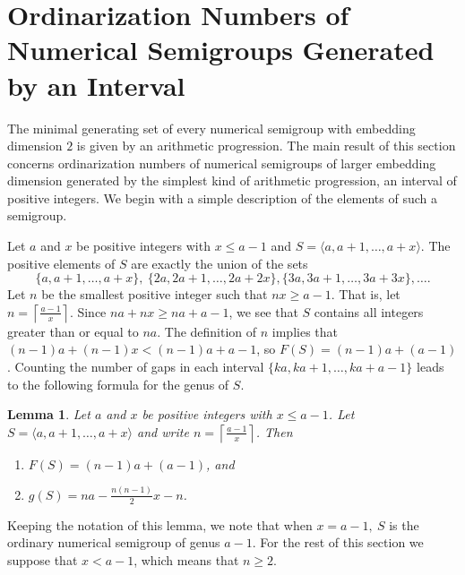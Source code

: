 \documentclass[12pt]{amsart}
\theoremstyle{plain}\newtheorem{proposition}{Proposition}[section]
\newtheorem{lemma}[proposition]{Lemma}
\begin{document}
\section{Ordinarization Numbers of Numerical Semigroups Generated by an Interval}\label{sec:interval}

The minimal generating set of every numerical semigroup with embedding dimension $2$ is given by an arithmetic progression.  The main result of this section concerns ordinarization numbers of numerical semigroups of larger embedding dimension generated by the simplest kind of arithmetic progression, an interval of positive integers.  We begin with a simple description of the elements of such a semigroup.

Let $a$ and $x$ be positive integers with $x \le a-1$ and $S = \langle a,a+1,\ldots, a+x\rangle$.  The positive elements of $S$ are exactly the union of the sets 
\[
\{a,a+1,\ldots, a+x\},\ \{2a,2a+1,\ldots, 2a+2x\},\{3a,3a+1,\ldots, 3a+3x\},\ldots.
\]
Let $n$ be the smallest positive integer such that $nx \ge a-1$.  That is, let $n = \left\lceil \frac{a-1}{x} \right\rceil$.  Since $na + nx \ge na+a-1$, we see that $S$ contains all integers greater than or equal to $na$.  The definition of $n$ implies that $(n-1)a + (n-1)x < (n-1)a+a-1$, so $F(S) = (n-1)a + (a-1)$.  Counting the number of gaps in each interval $\{ka, ka+1,\ldots, ka+a-1\}$ leads to the following formula for the genus of $S$.
\begin{lemma}\label{d1}
Let $a$ and $x$ be positive integers with $x \le a-1$.  Let $S = \langle a,a+1,\ldots, a+x\rangle$ and write $n = \left\lceil \frac{a-1}{x} \right\rceil$.   Then 
\begin{enumerate}
\item $F(S) = (n-1)a + (a-1)$, and 
\item $g(S) = na-\frac{n(n-1)}{2}x-n$.
\end{enumerate}
\end{lemma}
\noindent Keeping the notation of this lemma, we note that when $x = a-1,\ S$ is the ordinary numerical semigroup of genus $a-1$.  For the rest of this section we suppose that $x < a-1$, which means that $n \ge 2$.
\end{document}
